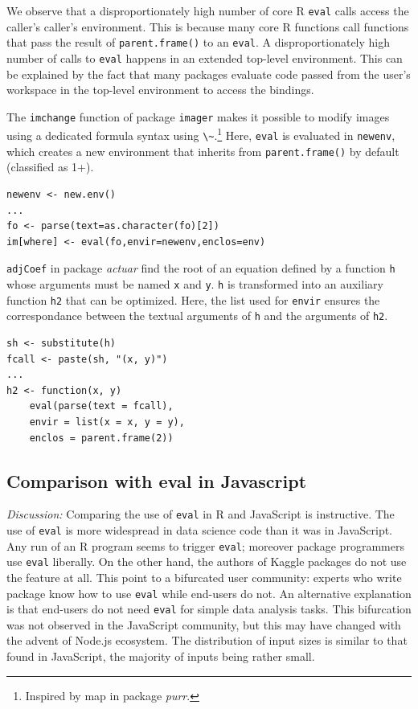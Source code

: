 \documentclass[a4paper,USenglish,cleveref, autoref, thm-restate]{lipics-v2019}
\newcommand{\eval}{\texttt{eval}\xspace}
\renewcommand{\c}[1]{\lstinline{#1}\xspace}
\begin{document}
We observe that a disproportionately high number of core R \eval calls
access the caller's caller's environment. This is because many core R
functions call functions that pass the result of \c{parent.frame()} to an
\eval.  A disproportionately high number of calls to \eval happens in an
extended top-level environment. This can be explained by the fact that many
packages evaluate code passed from the user's workspace in the top-level
environment to access the bindings.


The \c{imchange} function of package \c{imager} makes it possible to modify
images using a dedicated formula syntax using \c{\~}.\footnote{Inspired by
 {map} in package \emph{purr}.}  Here, \eval is evaluated in \c{newenv},
which creates a new environment that inherits from \c{parent.frame()} by
default (classified as 1+).


\begin{lstlisting}
newenv <- new.env()
...
fo <- parse(text=as.character(fo)[2])
im[where] <- eval(fo,envir=newenv,enclos=env)
\end{lstlisting}

\c{adjCoef} in package \emph{actuar} find the root of an equation defined by
a function \c{h} whose arguments must be named \c{x} and \c{y}.  \c{h} is
transformed into an auxiliary function \c{h2} that can be optimized. Here,
the list used for \c{envir} ensures the correspondance between the textual
arguments of \c{h} and the arguments of \c{h2}.


\begin{lstlisting}
sh <- substitute(h)
fcall <- paste(sh, "(x, y)")
...
h2 <- function(x, y)
    eval(parse(text = fcall),
    envir = list(x = x, y = y),
    enclos = parent.frame(2))
\end{lstlisting}

\subsection{Comparison with eval in Javascript}

\medskip\noindent\emph{Discussion:} Comparing the use of \eval in R and
JavaScript is instructive. The use of \eval is more widespread in data
science code than it was in JavaScript. Any run of an R program seems to
trigger \eval; moreover package programmers use \eval liberally. On the
other hand, the authors of Kaggle packages do not use the feature at all.
This point to a bifurcated user community: experts who write package know
how to use \eval while end-users do not. An alternative explanation is that
end-users do not need \eval for simple data analysis tasks. This bifurcation
was not observed in the JavaScript community, but this may have changed with
the advent of Node.js ecosystem.  The distribution of input sizes is similar
to that found in JavaScript, the majority of inputs being rather small.
\end{document}
